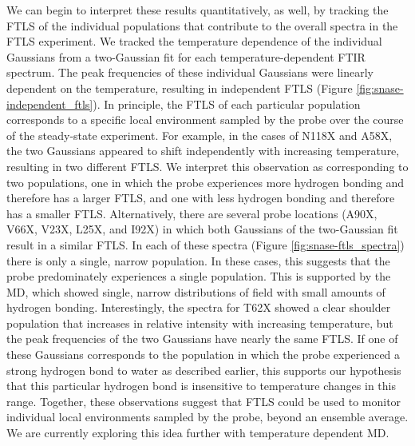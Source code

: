 We can begin to interpret these results quantitatively, as well, by tracking the FTLS of the individual populations that contribute to the overall spectra in the FTLS experiment. 
We tracked the temperature dependence of the individual Gaussians from a two-Gaussian fit for each temperature-dependent FTIR spectrum. 
The peak frequencies of these individual Gaussians were linearly dependent on the temperature, resulting in independent FTLS (Figure \ref{fig:snase-independent_ftls}). 
In principle, the FTLS of each particular population corresponds to a specific local environment sampled by the probe over the course of the steady-state experiment. 
For example, in the cases of N118X and A58X, the two Gaussians appeared to shift independently with increasing temperature, resulting in two different FTLS. 
We interpret this observation as corresponding to two populations, one in which the probe experiences more hydrogen bonding and therefore has a larger FTLS, and one with less hydrogen bonding and therefore has a smaller FTLS. 
Alternatively, there are several probe locations (A90X, V66X, V23X, L25X, and I92X) in which both Gaussians of the two-Gaussian fit result in a similar FTLS. 
In each of these spectra (Figure \ref{fig:snase-ftls_spectra}) there is only a single, narrow population. 
In these cases, this suggests that the probe predominately experiences a single population. 
This is supported by the MD, which showed single, narrow distributions of field with small amounts of hydrogen bonding. 
Interestingly, the spectra for T62X showed a clear shoulder population that increases in relative intensity with increasing temperature, but the peak frequencies of the two Gaussians have nearly the same FTLS. 
If one of these Gaussians corresponds to the population in which the probe experienced a strong hydrogen bond to water as described earlier, this supports our hypothesis that this particular hydrogen bond is insensitive to temperature changes in this range. 
Together, these observations suggest that FTLS could be used to monitor individual local environments sampled by the probe, beyond an ensemble average. 
We are currently exploring this idea further with temperature dependent MD.

